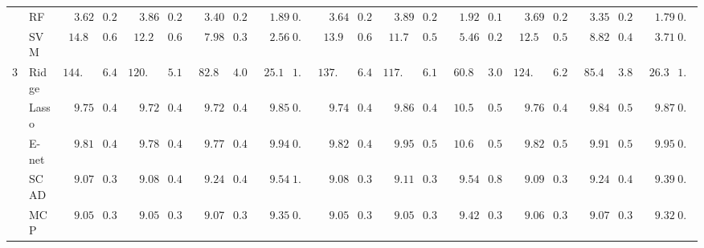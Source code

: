 \begin{tabular}{p{0.2cm}p{1cm}|p{0.6cm}p{0.6cm}|p{0.6cm}p{0.6cm}p{0.6cm}p{0.6cm}p{0.6cm}p{0.6cm}|p{0.6cm}p{0.6cm}p{0.6cm}p{0.6cm}p{0.6cm}p{0.6cm}|p{0.6cm}p{0.6cm}p{0.6cm}p{0.6cm}p{0.6cm}p{0.6cm}}
 & RF  & $\phantom{00}3.62$ & $\phantom{0}0.26$ & $\phantom{00}3.86$ & $\phantom{0}0.27$ & $\phantom{00}3.40$ & $\phantom{0}0.22$ & $\phantom{00}1.89$ & $0.10$ & $\phantom{00}3.64$ & $\phantom{0}0.24$ & $\phantom{00}3.89$ & $\phantom{0}0.25$ & $\phantom{00}1.92$ & $\phantom{0}0.10$ & $\phantom{00}3.69$ & $\phantom{0}0.28$ & $\phantom{00}3.35$ & $\phantom{0}0.20$ & $\phantom{00}1.79$ & $0.08$ \\
 & SVM  & $\phantom{0}14.80$ & $\phantom{0}0.66$ & $\phantom{0}12.24$ & $\phantom{0}0.60$ & $\phantom{00}7.98$ & $\phantom{0}0.39$ & $\phantom{00}2.56$ & $0.14$ & $\phantom{0}13.98$ & $\phantom{0}0.61$ & $\phantom{0}11.79$ & $\phantom{0}0.57$ & $\phantom{00}5.46$ & $\phantom{0}0.25$ & $\phantom{0}12.59$ & $\phantom{0}0.58$ & $\phantom{00}8.82$ & $\phantom{0}0.40$ & $\phantom{00}3.71$ & $0.18$ \\\hline
3 & Ridge  & $144.14$ & $\phantom{0}6.47$ & $120.54$ & $\phantom{0}5.17$ & $\phantom{0}82.87$ & $\phantom{0}4.01$ & $\phantom{0}25.16$ & $1.14$ & $137.01$ & $\phantom{0}6.46$ & $117.91$ & $\phantom{0}6.16$ & $\phantom{0}60.80$ & $\phantom{0}3.01$ & $124.21$ & $\phantom{0}6.22$ & $\phantom{0}85.45$ & $\phantom{0}3.89$ & $\phantom{0}26.35$ & $1.29$ \\
 & Lasso  & $\phantom{00}9.75$ & $\phantom{0}0.46$ & $\phantom{00}9.72$ & $\phantom{0}0.47$ & $\phantom{00}9.72$ & $\phantom{0}0.48$ & $\phantom{00}9.85$ & $0.47$ & $\phantom{00}9.74$ & $\phantom{0}0.45$ & $\phantom{00}9.86$ & $\phantom{0}0.49$ & $\phantom{0}10.51$ & $\phantom{0}0.56$ & $\phantom{00}9.76$ & $\phantom{0}0.49$ & $\phantom{00}9.84$ & $\phantom{0}0.50$ & $\phantom{00}9.87$ & $0.48$ \\
 & E-net  & $\phantom{00}9.81$ & $\phantom{0}0.46$ & $\phantom{00}9.78$ & $\phantom{0}0.47$ & $\phantom{00}9.77$ & $\phantom{0}0.48$ & $\phantom{00}9.94$ & $0.47$ & $\phantom{00}9.82$ & $\phantom{0}0.47$ & $\phantom{00}9.95$ & $\phantom{0}0.50$ & $\phantom{0}10.65$ & $\phantom{0}0.56$ & $\phantom{00}9.82$ & $\phantom{0}0.50$ & $\phantom{00}9.91$ & $\phantom{0}0.51$ & $\phantom{00}9.95$ & $0.49$ \\
 & SCAD  & $\phantom{00}9.07$ & $\phantom{0}0.37$ & $\phantom{00}9.08$ & $\phantom{0}0.40$ & $\phantom{00}9.24$ & $\phantom{0}0.44$ & $\phantom{00}9.54$ & $1.17$ & $\phantom{00}9.08$ & $\phantom{0}0.39$ & $\phantom{00}9.11$ & $\phantom{0}0.38$ & $\phantom{00}9.54$ & $\phantom{0}0.86$ & $\phantom{00}9.09$ & $\phantom{0}0.39$ & $\phantom{00}9.24$ & $\phantom{0}0.45$ & $\phantom{00}9.39$ & $0.82$ \\
 & MCP  & $\phantom{00}9.05$ & $\phantom{0}0.37$ & $\phantom{00}9.05$ & $\phantom{0}0.39$ & $\phantom{00}9.07$ & $\phantom{0}0.39$ & $\phantom{00}9.35$ & $0.40$ & $\phantom{00}9.05$ & $\phantom{0}0.39$ & $\phantom{00}9.05$ & $\phantom{0}0.38$ & $\phantom{00}9.42$ & $\phantom{0}0.38$ & $\phantom{00}9.06$ & $\phantom{0}0.38$ & $\phantom{00}9.07$ & $\phantom{0}0.39$ & $\phantom{00}9.32$ & $0.39$ \\

\end{tabular}

